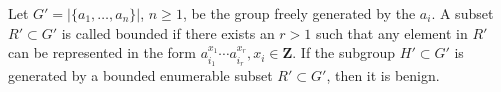 Let $G' = |\{a_1, \ldots, a_n\}|$, $n \geqslant 1$, be the group freely generated by the $a_i$. A subset $R' \subset G'$ is called bounded if there exists an $r > 1$ such that any element in $R'$ can be represented in the form $a_{i_1}^{x_1} \cdots a_{i_r}^{x_r}, x_i \in \mathbf{Z}$. If the subgroup $H' \subset G'$ is generated by a bounded enumerable subset $R' \subset G'$, then it is benign.
